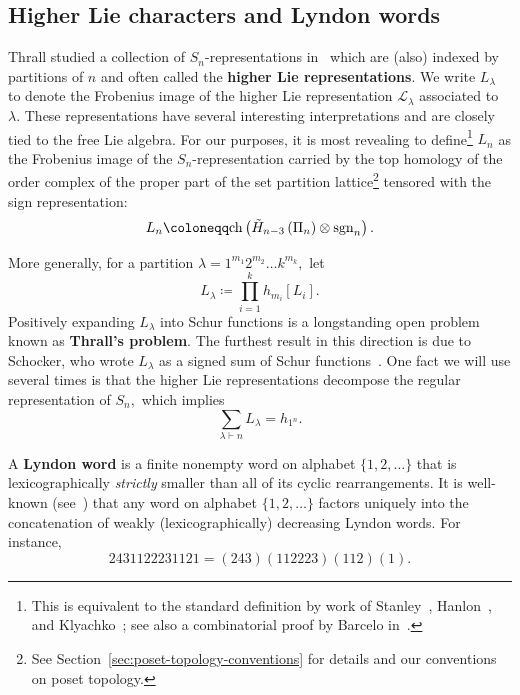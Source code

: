 \documentclass[ALCO, Unicode]{cedram}
\def\ch{\mathrm{ch}}
\def\sgn{\mathrm{sgn}}
\def\ch{\mathrm{ch}}
\begin{document}
\subsection{Higher Lie characters and Lyndon words}\label{subsec:wreathplethysmlielyndon}


Thrall studied a collection of $S_n$-representations in~\cite{Thrall} which are (also) indexed by partitions of $n$ and often called the \textbf{higher Lie representations}.  We write \textbf{$L_\lambda$} to denote the Frobenius image of the higher Lie representation \textbf{$\mathscr{L}_\lambda$} associated to $\lambda.$ These representations have several interesting {interpretations} and are closely tied to the free Lie algebra.  For our purposes, it is most revealing to {define}\footnote{This is equivalent to the standard definition by work of Stanley~\cite[Theorem 7.3]{stanley_grps_on_postes}, Hanlon~\cite[Theorem 4]{Hanlon}, and Klyachko~\cite{Klyachko}; see also a combinatorial proof by Barcelo in~\cite{BARCELO199093}.} $L_{n}$ as the Frobenius image of the $S_n$-representation carried by the top homology of the order complex of the proper part of the set partition {lattice}\footnote{See Section~\ref{sec:poset-topology-conventions} for details and our conventions on poset topology.} tensored with the sign representation:
\begin{align*}
    L_n  \coloneqq  \ch \left(\Tilde{H}_{n - 3} \left(\Pi_n\right) \otimes \sgn_n\right).
\end{align*}

More generally, for a partition $\lambda = 1^{m_1}2^{m_2} \ldots k^{m_k},$ let 
\begin{equation} \label{eqn:def-higher-lie}
    L_\lambda  \coloneqq  \prod_{i = 1}^k h_{m_i}[L_i].
\end{equation} Positively expanding $L_\lambda$ into Schur functions is a longstanding open problem known as \textbf{Thrall's problem}. The furthest result in this direction is due to Schocker, who wrote $L_\lambda$ as a signed sum of Schur functions~\cite{schocker2003multiplicities}. One fact we will use several times is that the higher Lie representations decompose the regular representation of $S_n,$ which implies
\begin{equation}\label{eqn:higher-Lies-decompose-h1n}
    \sum_{\lambda \vdash n}L_\lambda = h_{1^n}.
\end{equation}



    A \textbf{Lyndon word} is a finite nonempty word on alphabet $\{1, 2, \ldots \}$  that is lexicographically \textit{strictly} smaller than all of its cyclic rearrangements. It is well-known (see~\cite[Theorem 5.1.5]{Lothaire_1997}) that any word on alphabet $\{1, 2, \ldots\}$ factors uniquely into the concatenation of weakly (lexicographically) decreasing Lyndon words. For instance, \[2431122231121 = (243)(112223)(112)(1).\]
    
\end{document}

